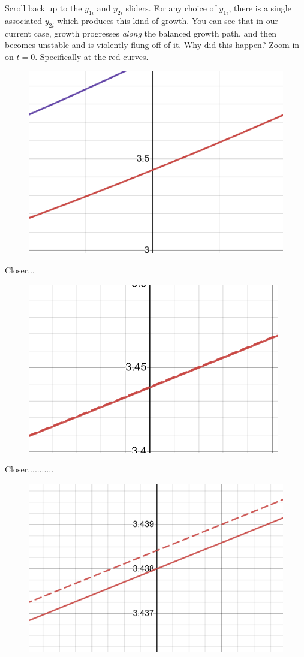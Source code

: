 \documentclass{article}
\theoremstyle{theorem}
\begin{document}
 Scroll back up to the $y_{1i}$ and $y_{2i}$ sliders. For any choice of $y_{1i}$, there is a single associated $y_{2i}$ which produces this kind of growth. You can see that in our current case, growth progresses \emph{along} the balanced growth path, and then becomes unstable and is violently flung off of it. Why did this happen? Zoom in on $t=0$. Specifically at the red curves.
\begin{figure}[H] 
\centering
\includegraphics[scale=0.8]{Images/close} 
\end{figure}
Closer...
\begin{figure}[H] 
\centering
\includegraphics[scale=1]{Images/close1} 
\end{figure}
Closer...........
\begin{figure}[H] 
\centering
\includegraphics[scale=0.9]{Images/close2} 
\end{figure}
\end{document}
